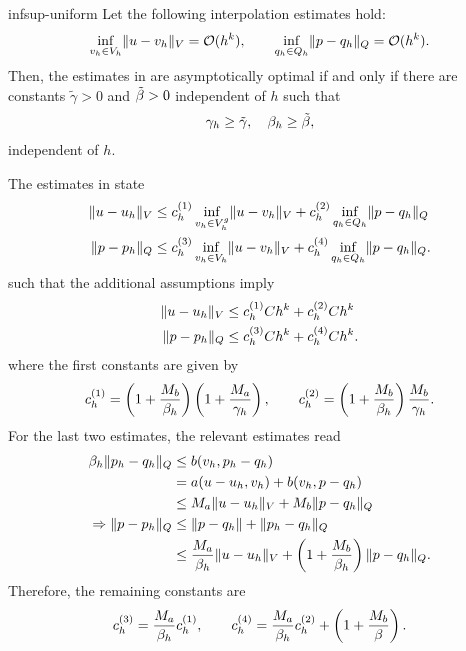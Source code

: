 \begin{Problem}{infsup-uniform}
  Let the following interpolation estimates hold:
  \begin{gather}
    \inf_{v_h\in V_h}\lVert u-v_h\rVert_V = \mathcal O(h^k),
    \qquad
    \inf_{q_h\in Q_h}\lVert p-q_h\rVert_Q = \mathcal O(h^k).
  \end{gather}
  Then, the estimates in 
  are asymptotically optimal if and only if there are
  constants $\tilde \gamma>0$ and $\tilde {\beta}>0$ independent of
  $h$ such that
  \begin{gather}
    \label{eq:galerkin:14}
    \gamma_h\ge \tilde\gamma,\quad\beta_h\ge\tilde{\beta},
  \end{gather}
  independent of $h$.
\begin{solution}
  The estimates in  state
  \begin{align}
    \lVert u-u_h\rVert_V &\le c_h^{(1)} \inf_{v_h\in V_h^g}\lVert u-v_h\rVert_V
	      + c_h^{(2)} \inf_{q_h\in Q_h}\lVert p-q_h\rVert_Q \\
    \lVert p-p_h\rVert_Q &\le c_h^{(3)} \inf_{v_h\in V_h}\lVert u-v_h\rVert_V
	      + c_h^{(4)} \inf_{q_h\in Q_h}\lVert p-q_h\rVert_Q.
  \end{align}
  such that the additional assumptions imply
  \begin{align}
    \lVert u-u_h\rVert_V &\le c_h^{(1)} C h^k + c_h^{(2)} C h^k \\
    \lVert p-p_h\rVert_Q &\le c_h^{(3)} C h^k + c_h^{(4)} C h^k.
  \end{align}
    where the first constants are given by
  \begin{align}
    c_h^{(1)} = \left(1+\frac{M_b}{\beta_h}\right)
    \left(1+\frac{M_a}{\gamma_h}\right),
    \qquad
    c_h^{(2)} = \left(1+\frac{M_b}{\beta_h}\right)
    \frac{M_b}{\gamma_h}.
  \end{align}
  For the last two estimates, the relevant estimates read
  \begin{align}
    \beta_h \lVert p_h-q_h\rVert_Q
    &\le b(v_h,p_h-q_h)\\
    & = a(u-u_h, v_h) + b(v_h, p-q_h)\\
    &\le M_a \lVert u-u_h\rVert_V + M_b \lVert p-q_h\rVert_Q\\
    \Rightarrow \lVert p-p_h\rVert_Q
    &\le \lVert p-q_h\rVert + \lVert p_h-q_h\rVert_Q \\
    &\le \frac{M_a}{\beta_h} \lVert u-u_h\rVert_V + \left(1+\frac{M_b}{\beta_h}\right) \lVert p-q_h\rVert_Q.
  \end{align}
  Therefore, the remaining constants are
  \begin{align}
    c_h^{(3)} = \frac{M_a}{\beta_h}c_h^{(1)}, \qquad
    c_h^{(4)} = \frac{M_a}{\beta_h}c_h^{(2)}+\left(1+\frac{M_b}{\beta}\right).
  \end{align}
\end{solution}
\end{Problem}

